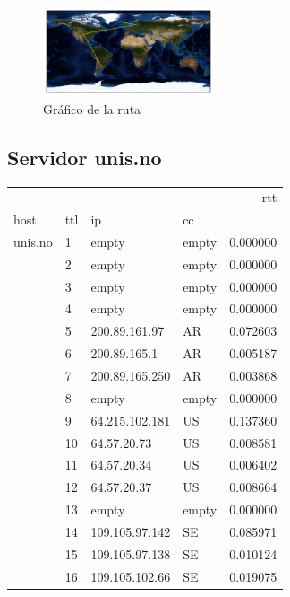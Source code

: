 \begin{figure}[H]
  \centering
    \includegraphics[width=0.45\textwidth]{grafico-rutas/unak-is.png}
  \caption{Gráfico de la ruta}
  \label{entropia-s}
\end{figure}



\subsection{Servidor unis.no}
\begin{center}
\begin{tabular}{llllr}
\toprule
        &    &                &    &       rtt \\
host & ttl & ip & cc &           \\
\midrule
unis.no & 1  & empty & empty &  0.000000 \\
        & 2  & empty & empty &  0.000000 \\
        & 3  & empty & empty &  0.000000 \\
        & 4  & empty & empty &  0.000000 \\
        & 5  & 200.89.161.97 & AR &  0.072603 \\
        & 6  & 200.89.165.1 & AR &  0.005187 \\
        & 7  & 200.89.165.250 & AR &  0.003868 \\
        & 8  & empty & empty &  0.000000 \\
        & 9  & 64.215.102.181 & US &  0.137360 \\
        & 10 & 64.57.20.73 & US &  0.008581 \\
        & 11 & 64.57.20.34 & US &  0.006402 \\
        & 12 & 64.57.20.37 & US &  0.008664 \\
        & 13 & empty & empty &  0.000000 \\
        & 14 & 109.105.97.142 & SE &  0.085971 \\
        & 15 & 109.105.97.138 & SE &  0.010124 \\
        & 16 & 109.105.102.66 & SE &  0.019075 \\

\end{tabular}
\end{center}
